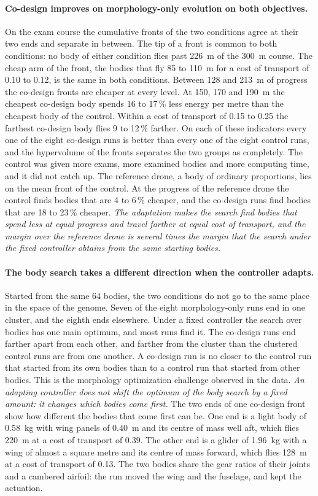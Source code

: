 \paragraph{Co-design improves on morphology-only evolution on both objectives.} On the exam course the cumulative fronts of the two conditions agree at their two ends and separate in between. The tip of a front is common to both conditions: no body of either condition flies past 226~m of the 300~m course. The cheap arm of the front, the bodies that fly 85 to 110~m for a cost of transport of 0.10 to 0.12, is the same in both conditions. Between 128 and 213~m of progress the co-design fronts are cheaper at every level. At 150, 170 and 190~m the cheapest co-design body spends 16 to 17\,\% less energy per metre than the cheapest body of the control. Within a cost of transport of 0.15 to 0.25 the farthest co-design body flies 9 to 12\,\% farther. On each of these indicators every one of the eight co-design runs is better than every one of the eight control runs, and the hypervolume of the fronts separates the two groups as completely. The control was given more exams, more examined bodies and more computing time, and it did not catch up. The reference drone, a body of ordinary proportions, lies on the mean front of the control. At the progress of the reference drone the control finds bodies that are 4 to 6\,\% cheaper, and the co-design runs find bodies that are 18 to 23\,\% cheaper. \emph{The adaptation makes the search find bodies that spend less at equal progress and travel farther at equal cost of transport, and the margin over the reference drone is several times the margin that the search under the fixed controller obtains from the same starting bodies.}

\paragraph{The body search takes a different direction when the controller adapts.} Started from the same 64 bodies, the two conditions do not go to the same place in the space of the genome. Seven of the eight morphology-only runs end in one cluster, and the eighth ends elsewhere. Under a fixed controller the search over bodies has one main optimum, and most runs find it. The co-design runs end farther apart from each other, and farther from the cluster than the clustered control runs are from one another. A co-design run is no closer to the control run that started from its own bodies than to a control run that started from other bodies. This is the morphology optimization challenge observed in the data. \emph{An adapting controller does not shift the optimum of the body search by a fixed amount: it changes which bodies come first.} The two ends of one co-design front show how different the bodies that come first can be. One end is a light body of 0.58~kg with wing panels of 0.40~m and its centre of mass well aft, which flies 220~m at a cost of transport of 0.39. The other end is a glider of 1.96~kg with a wing of almost a square metre and its centre of mass forward, which flies 128~m at a cost of transport of 0.13. The two bodies share the gear ratios of their joints and a cambered airfoil: the run moved the wing and the fuselage, and kept the actuation.

